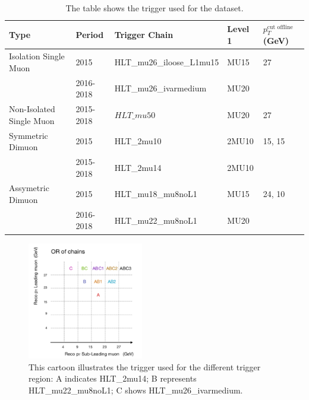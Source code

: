 \begin{table}[!htb]
    \begin{center}
    \caption{
        The table shows the trigger used for the dataset.
    }
\label{tab:Data Trigger}
\begin{tabular}{|l|l|l|l|l}
\hline
\textbf{Type}   & \textbf{Period}                                                         &\textbf{Trigger Chain} &\textbf{Level 1} &\textbf{$p_{T}^{\textrm{cut offline}}$ (GeV)}\\ \hline
Isolation Single Muon   & 2015 & HLT\_mu26\_iloose\_L1mu15 & MU15 & 27 \\ 
                        & 2016-2018  & HLT\_mu26\_ivarmedium    & MU20 & \\ \hline
Non-Isolated Single Muon & 2015-2018                                       &$HLT\_mu50$& MU20& 27 \\ \hline
Symmetric Dimuon & 2015 & HLT\_2mu10 & 2MU10 & 15, 15 \\
                 & 2015-2018 & HLT\_2mu14 & 2MU10 & \\ \hline
Assymetric Dimuon & 2015 & HLT\_mu18\_mu8noL1 & MU15 & 24, 10 \\
                  & 2016-2018 & HLT\_mu22\_mu8noL1 & MU20 \\ \hline
\end{tabular}
\end{center}
\end{table}

\begin{figure}[!htb]
    \begin{center}
        \includegraphics[width=0.45\textwidth]{figures/chapter_dimuon/TriggerChain}        
        \caption{
        This cartoon illustrates the trigger used for the different trigger region: A indicates HLT\_2mu14; B represents HLT\_mu22\_mu8noL1; C shows HLT\_mu26\_ivarmedium. }
    \end{center}
\end{figure}
\FloatBarrier

